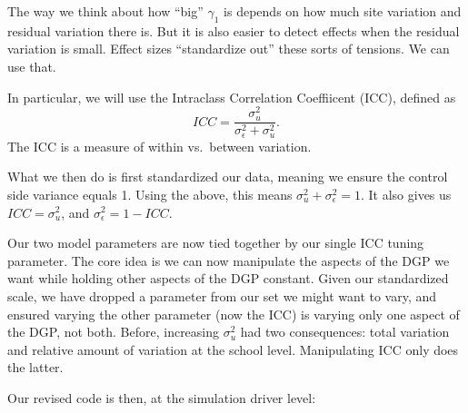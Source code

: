 \documentclass[
]{book}
\begin{document}
The way we think about how ``big'' \(\gamma_1\) is depends on how much site variation and residual variation there is.
But it is also easier to detect effects when the residual variation is small.
Effect sizes ``standardize out'' these sorts of tensions. We can use that.

In particular, we will use the Intraclass Correlation Coeffiicent (ICC), defined as
\[ ICC = \frac{ \sigma^2_u }{ \sigma^2_\epsilon + \sigma^2_u } . \]
The ICC is a measure of within vs.~between variation.

What we then do is first standardized our data, meaning we ensure the control side variance equals 1.
Using the above, this means \(\sigma^2_u + \sigma^2_\epsilon = 1\).
It also gives us \(ICC = \sigma^2_u\), and \(\sigma^2_\epsilon = 1 - ICC\).

Our two model parameters are now tied together by our single ICC tuning parameter.
The core idea is we can now manipulate the aspects of the DGP we want while holding other aspects of the DGP constant.
Given our standardized scale, we have dropped a parameter from our set we might want to vary, and ensured varying the other parameter (now the ICC) is varying only one aspect of the DGP, not both.
Before, increasing \(\sigma^2_u\) had two consequences: total variation and relative amount of variation at the school level.
Manipulating ICC only does the latter.

Our revised code is then, at the simulation driver level:
\end{document}
